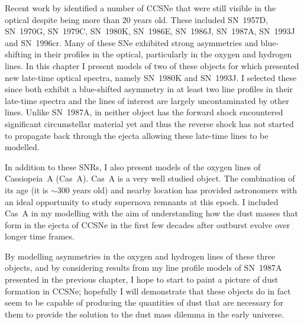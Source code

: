 Recent work by \citet{Milisavljevic2012} identified a number of CCSNe that were still visible in the optical despite being more than 20 years old.  These included SN~1957D, SN~1970G, SN~1979C, SN~1980K, SN~1986E, SN~1986J, SN~1987A, SN~1993J and SN~1996cr.  Many of these SNe exhibited strong asymmetries and blue-shifting in their profiles in the optical, particularly in the oxygen and hydrogen lines.  In this chapter I present models of two of these objects for which \citet{Milisavljevic2012} presented new late-time optical spectra, namely SN~1980K and SN~1993J.  I selected these since both exhibit a blue-shifted asymmetry in at least two line profiles in their late-time spectra and the lines of interest are largely uncontaminated by other lines.  Unlike SN~1987A, in neither object has the forward shock encountered significant circumstellar material yet and thus the reverse shock has not  started to propagate back through the ejecta allowing these late-time lines to be modelled.

In addition to these SNRs, I also present models of the oxygen lines of Cassiopeia~A (Cas~A).  Cas~A is a very well studied object.  The combination of its age (it is $\sim300$ years old) and nearby location has provided astronomers with an ideal opportunity to study supernova remnants at this epoch.  I included Cas~A in my modelling with the aim of understanding how the dust masses that form in the ejecta of CCSNe in the first few decades after outburst evolve over longer time frames. 

By modelling asymmetries in the oxygen and hydrogen lines of these three objects, and by considering results from my line profile models of SN~1987A presented in the previous chapter, I hope to start to paint a picture of dust formation in CCSNe;  hopefully I will demonstrate that these objects do in fact seem to be capable of producing the quantities of dust that are necessary for them to provide the solution to the dust mass dilemma in the early universe.

